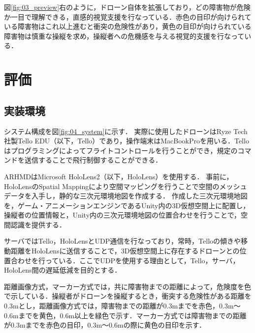 \documentclass[submit,techrep]{ipsj}
\begin{document}
図\ref{fig:03_preview}右のように，ドローン自体を拡張しており，どの障害物が危険か一目で理解できる，直感的視覚支援を行なっている．赤色の目印が向けられている障害物はこれ以上進むと衝突の危険性があり，黄色の目印が向けられている障害物は慎重な操縦を求め，操縦者への危機感を与える視覚的支援を行なっている．


\section{評価}

\subsection{実装環境}
システム構成を図\ref{fig:04_system}に示す．
実際に使用したドローンはRyze Tech社製Tello EDU（以下，Tello）であり，操作端末はMacBookProを用いる．Telloはプログラミングによってフライトコントロールを行うことができ，規定のコマンドを送信することで飛行制御することができる．
\par
ARHMDはMicrosoft HoloLens2（以下，HoloLens）を使用する．
事前に，HoloLensのSpatial Mappingにより空間マッピングを行うことで空間のメッシュデータを入手し，静的な三次元環境地図を作成する．
作成した三次元環境地図を，ゲーム・アニメーションエンジンであるUnity内の3D仮想空間上に配置し，操縦者の位置情報と，Unity内の三次元環境地図の位置合わせを行うことで，空間認識を提供する．
\par
サーバではTello，HoloLensとUDP通信を行なっており，常時，Telloの傾きや移動距離をHoloLensに送信することで，3D仮想空間上に存在するドローンとの位置合わせを行っている．ここでUDPを使用する理由として，Tello，サーバ，HoloLens間の遅延低減を目的とする．
\par
距離画像方式，マーカー方式では，共に障害物までの距離によって，危険度を色で示している．操縦者がドローンを操縦するとき，衝突する危険性がある距離を0.3mとし\cite{Yamada}，距離画像方式では，障害物までの距離が0.3mまでを赤色，0.3m〜0.6mまでを黄色，0.6m以上を緑色で示す．マーカー方式では障害物までの距離が0.3mまでを赤色の目印，0.3m〜0.6mの際に黄色の目印を示す．


\end{document}
